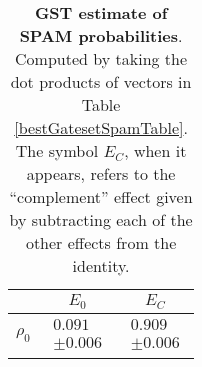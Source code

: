 \documentclass{article}[11pt]
\begin{document}
\begin{table}[h]
\begin{center}
\begin{tabular}[l]{|c|c|c|}
\hline
 & $E_{0}$ & $E_C$ \\ \hline
$\rho_{0}$ & $ \begin{array}{c} 0.091 \\ \pm 0.006 \end{array} $ & $ \begin{array}{c} 0.909 \\ \pm 0.006 \end{array} $ \\ \hline
\end{tabular}

\caption{\textbf{GST estimate of SPAM probabilities}.  Computed by taking the dot products of vectors in Table \ref{bestGatesetSpamTable}.  The symbol $E_C$, when it appears, refers to the ``complement'' effect given by subtracting each of the other effects from the identity.\label{bestGatesetSpamParametersTable}}
\end{center}
\end{table}
\end{document}

